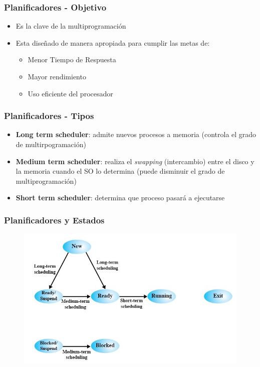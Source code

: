 \begin{frame}
  \frametitle{Planificadores - \textbf{Objetivo}}
  \begin{itemize}
	  \item Es la clave de la multiprogramación
	  \item Esta diseñado de manera apropiada para cumplir las metas de:
	  \begin{itemize}
	  	\item Menor Tiempo de Respuesta
	  	\item Mayor rendimiento
	  	\item Uso eficiente del procesador
	  \end{itemize}
  \end{itemize}
\end{frame}

\begin{frame}
  \frametitle{Planificadores - \textbf{Tipos}}
  \begin{itemize}
		\item \textbf{Long term scheduler}: admite nuevos procesos a memoria (controla el grado de multirpogramación)
		\item \textbf{Medium term scheduler}: realiza el \emph{swapping} (intercambio) entre el disco y la memoria cuando el SO lo determina (puede disminuir el grado de multiprogramación)
		\item \textbf{Short term scheduler}: determina que proceso pasará a ejecutarse
  \end{itemize}
\end{frame}

\begin{frame}
  \frametitle{Planificadores y Estados}
  \begin{figure}
    \includegraphics[scale=0.4]{images/statesSchedulers.png}
  \end{figure}
\end{frame}


